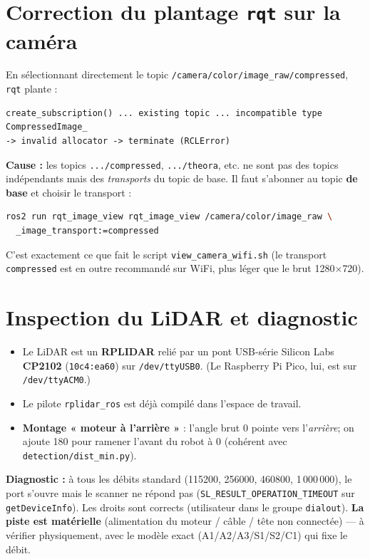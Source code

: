 \documentclass[a4paper,11pt]{article}
\begin{document}
\section{Correction du plantage \texttt{rqt} sur la caméra}
En sélectionnant directement le topic \texttt{/camera/color/image\_raw/compressed},
\texttt{rqt} plante :
\begin{lstlisting}
create_subscription() ... existing topic ... incompatible type CompressedImage_
-> invalid allocator -> terminate (RCLError)
\end{lstlisting}
\textbf{Cause :} les topics \texttt{.../compressed}, \texttt{.../theora}, etc. ne
sont pas des topics indépendants mais des \emph{transports} du topic de base.
Il faut s'abonner au topic \textbf{de base} et choisir le transport :
\begin{lstlisting}[language=bash]
ros2 run rqt_image_view rqt_image_view /camera/color/image_raw \
  _image_transport:=compressed
\end{lstlisting}
C'est exactement ce que fait le script \texttt{view\_camera\_wifi.sh} (le
transport \texttt{compressed} est en outre recommandé sur WiFi, plus léger que
le brut 1280$\times$720).

\section{Inspection du LiDAR et diagnostic}
\begin{itemize}[leftmargin=1.4em]
  \item Le LiDAR est un \textbf{RPLIDAR} relié par un pont USB-série Silicon Labs
        \textbf{CP2102} (\texttt{10c4:ea60}) sur \texttt{/dev/ttyUSB0}.
        (Le Raspberry Pi Pico, lui, est sur \texttt{/dev/ttyACM0}.)
  \item Le pilote \texttt{rplidar\_ros} est déjà compilé dans l'espace de travail.
  \item \textbf{Montage « moteur à l'arrière »} : l'angle brut 0\textdegree{} pointe
        vers l'\emph{arrière}; on ajoute 180\textdegree{} pour ramener l'avant du
        robot à 0\textdegree{} (cohérent avec \texttt{detection/dist\_min.py}).
\end{itemize}

\noindent\textbf{Diagnostic :} à tous les débits standard (115200, 256000,
460800, 1\,000\,000), le port s'ouvre mais le scanner ne répond pas
(\texttt{SL\_RESULT\_OPERATION\_TIMEOUT} sur \texttt{getDeviceInfo}). Les droits
sont corrects (utilisateur dans le groupe \texttt{dialout}). \textbf{La piste est
matérielle} (alimentation du moteur / câble / tête non connectée) — à vérifier
physiquement, avec le modèle exact (A1/A2/A3/S1/S2/C1) qui fixe le débit.
\end{document}
